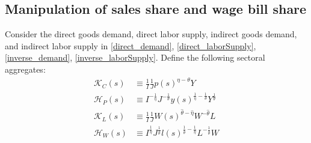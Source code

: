 \documentclass[12pt]{article}%
\begin{document}
\subsection{Manipulation of sales share and wage bill share} \label{appendix_sales&wageShares}
Consider the direct goods demand, direct labor supply, indirect goods demand, and indirect labor supply in \eqref{direct_demand}, \eqref{direct_laborSupply}, \eqref{inverse_demand}, \eqref{inverse_laborSupply}. Define the following sectoral aggregates:
\begin{align*}
    \mathcal{K}_C(s) & \equiv \frac{1}{I} \frac{1}{J} p(s)^{\eta - \theta} Y \\
    \mathcal{H}_P(s) & \equiv I^{- \frac{1}{\eta}} J^{- \frac{1}{\theta}} y(s)^{\frac{1}{\eta} - \frac{1}{\theta}} Y^{\frac{1}{\theta}}  \\
    \mathcal{K}_L(s) & \equiv \frac{1}{I} \frac{1}{J} W(s)^{\hat{\theta} - \hat{\eta}} W^{-\hat{\theta}} L \\
    \mathcal{H}_W(s) & \equiv I^{\frac{1}{\hat{\eta}}} J^{\frac{1}{\hat{\theta}}} l(s)^{\frac{1}{\hat{\theta}} - \frac{1}{\hat{\eta}}} L^{- \frac{1}{\hat{\theta}}} W
\end{align*}
\end{document}
